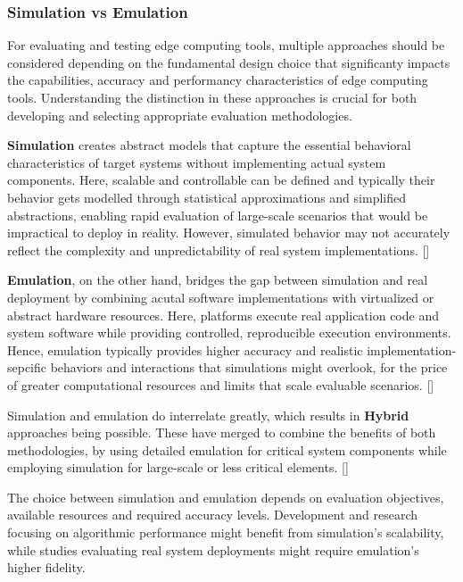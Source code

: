 \subsubsection{Simulation vs Emulation}
For evaluating and testing edge computing tools, multiple approaches should be considered depending on the fundamental design choice that significanty impacts the capabilities, accuracy and performancy characteristics of edge computing tools.
Understanding the distinction in these approaches is crucial for both developing and selecting appropriate evaluation methodologies.

\textbf{Simulation} creates abstract models that capture the essential behavioral characteristics of target systems without implementing actual system components.
Here, scalable and controllable can be defined and typically their behavior gets modelled through statistical approximations and simplified abstractions, enabling rapid evaluation of large-scale scenarios that would be impractical to deploy in reality.
However, simulated behavior may not accurately reflect the complexity and unpredictability of real system implementations. [\cite{inproceedings-sim-vs-emu}]

\textbf{Emulation}, on the other hand, bridges the gap between simulation and real deployment by combining acutal software implementations with virtualized or abstract hardware resources.
Here, platforms execute real application code and system software while providing controlled, reproducible execution environments.
Hence, emulation typically provides higher accuracy and realistic implementation-sepcific behaviors and interactions that simulations might overlook, for the price of greater computational resources and limits that scale evaluable scenarios. [\cite{inproceedings-sim-vs-emu}]

Simulation and emulation do interrelate greatly, which results in \textbf{Hybrid} approaches being possible.
These have merged to combine the benefits of both methodologies, by using detailed emulation for critical system components while employing simulation for large-scale or less critical elements. [\cite{inproceedings-sim-vs-emu}]

The choice between simulation and emulation depends on evaluation objectives, available resources and required accuracy levels.
Development and research focusing on algorithmic performance might benefit from simulation's scalability, while studies evaluating real system deployments might require emulation's higher fidelity.

